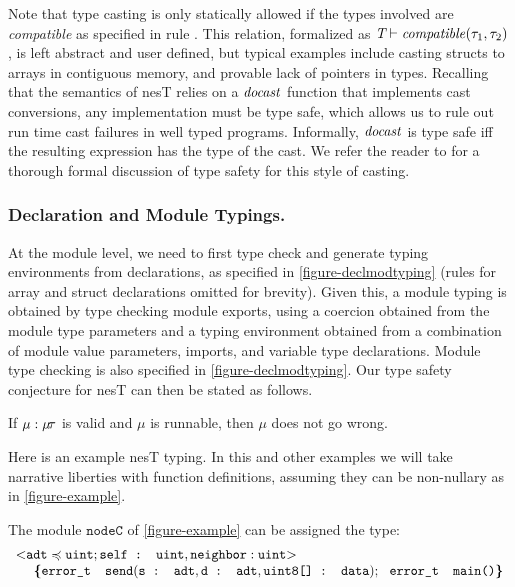 Note that type casting is only statically allowed if the types
involved are \emph{compatible} as specified in rule .
This relation, formalized as $\textit{T} \vdash \mathit{compatible}(\tau_1,\tau_2)$,
is left abstract and user defined, but typical examples include
casting structs to arrays in contiguous memory, and provable lack of
pointers in types.  Recalling that the semantics of nesT relies on a
$\mathit{docast}$ function that implements cast conversions, any
implementation must be type safe, which allows us to rule out run time
cast failures in well typed programs. Informally, $\mathit{docast}$ is
type safe iff the resulting expression has the type of the cast.  We
refer the reader to \cite{FramedML} for a thorough formal discussion of
type safety for this style of casting.

\subsubsection{Declaration and Module Typings.} At the module level, 
we need to first type check and generate typing environments from
declarations, as specified in \autoref{figure-declmodtyping} (rules
for array and struct declarations omitted for brevity). Given this, a
module typing is obtained by type checking module exports, using a
coercion obtained from the module type parameters and a typing
environment obtained from a combination of module value parameters,
imports, and variable type declarations. Module type checking is also
specified in \autoref{figure-declmodtyping}. Our type safety conjecture 
for nesT can then be stated as follows.

\begin{conject}
If $\mu : \mu\!\tau$ is valid and $\mu$ is runnable, then $\mu$ does not 
go wrong.
\end{conject}
Here is an example nesT typing. In this and other examples we will
take narrative liberties with function definitions, assuming they can
be non-nullary as in \autoref{figure-example}.
\begin{example}
\label{example-nesttyping}
The module $\texttt{nodeC}$ of \autoref{figure-example} can be assigned the type:
$$
\begin{array}{l}
\margs{\tt{adt} \subtype \tt{uint}; \texttt{self : uint}, \tt{neighbor : uint}}\\
\ \ \ \ \lc
\texttt{error\_t\ \ send}(\texttt{s : adt}, \texttt{d : adt}, \texttt{uint8[] : data});\ \ 
\texttt{error\_t\ \  main()} 
\rc
\end{array}
$$
\end{example}


